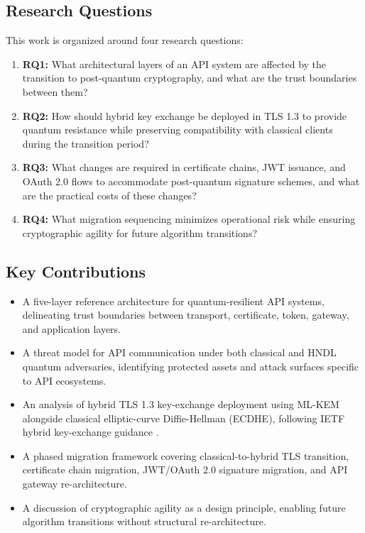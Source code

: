 \documentclass[conference]{IEEEtran}
\begin{document}
\subsection{Research Questions}

This work is organized around four research questions:

\begin{enumerate}
  \item \textbf{RQ1:} What architectural layers of an API system are
        affected by the transition to post-quantum cryptography, and what
        are the trust boundaries between them?
  \item \textbf{RQ2:} How should hybrid key exchange be deployed in TLS 1.3
        to provide quantum resistance while preserving compatibility with
        classical clients during the transition period?
  \item \textbf{RQ3:} What changes are required in certificate chains, JWT
        issuance, and OAuth 2.0 flows to accommodate post-quantum signature
        schemes, and what are the practical costs of these changes?
  \item \textbf{RQ4:} What migration sequencing minimizes operational risk
        while ensuring cryptographic agility for future algorithm
        transitions?
\end{enumerate}

\subsection{Key Contributions}

\begin{itemize}
  \item A five-layer reference architecture for quantum-resilient API
        systems, delineating trust boundaries between transport,
        certificate, token, gateway, and application layers.
  \item A threat model for API communication under both classical and HNDL
        quantum adversaries, identifying protected assets and attack
        surfaces specific to API ecosystems.
  \item An analysis of hybrid TLS 1.3 key-exchange deployment using ML-KEM
        alongside classical elliptic-curve Diffie-Hellman (ECDHE), following
        IETF hybrid key-exchange guidance \cite{ietf_hybrid_kex}.
  \item A phased migration framework covering classical-to-hybrid TLS
        transition, certificate chain migration, JWT/OAuth 2.0 signature
        migration, and API gateway re-architecture.
  \item A discussion of cryptographic agility as a design principle,
        enabling future algorithm transitions without structural
        re-architecture.
\end{itemize}
\end{document}
